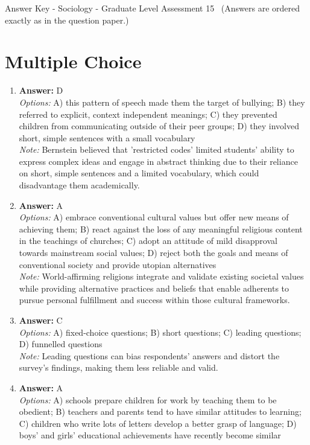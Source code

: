 \documentclass[12pt]{article}
\begin{document}
\begin{center}
Answer Key - Sociology - Graduate Level Assessment 15 \
\small (Answers are ordered exactly as in the question paper.)
\end{center}

\section*{Multiple Choice}
\begin{enumerate}[label=\arabic*.]
\item \textbf{Answer:} D
\\ \textit{Options:} A) this pattern of speech made them the target of bullying; B) they referred to explicit, context independent meanings; C) they prevented children from communicating outside of their peer groups; D) they involved short, simple sentences with a small vocabulary
\\ \textit{Note:} Bernstein believed that 'restricted codes' limited students' ability to express complex ideas and engage in abstract thinking due to their reliance on short, simple sentences and a limited vocabulary, which could disadvantage them academically.
\item \textbf{Answer:} A
\\ \textit{Options:} A) embrace conventional cultural values but offer new means of achieving them; B) react against the loss of any meaningful religious content in the teachings of churches; C) adopt an attitude of mild disapproval towards mainstream social values; D) reject both the goals and means of conventional society and provide utopian alternatives
\\ \textit{Note:} World-affirming religions integrate and validate existing societal values while providing alternative practices and beliefs that enable adherents to pursue personal fulfillment and success within those cultural frameworks.
\item \textbf{Answer:} C
\\ \textit{Options:} A) fixed-choice questions; B) short questions; C) leading questions; D) funnelled questions
\\ \textit{Note:} Leading questions can bias respondents' answers and distort the survey's findings, making them less reliable and valid.
\item \textbf{Answer:} A
\\ \textit{Options:} A) schools prepare children for work by teaching them to be obedient; B) teachers and parents tend to have similar attitudes to learning; C) children who write lots of letters develop a better grasp of language; D) boys' and girls' educational achievements have recently become similar

\end{enumerate}
\end{document}
